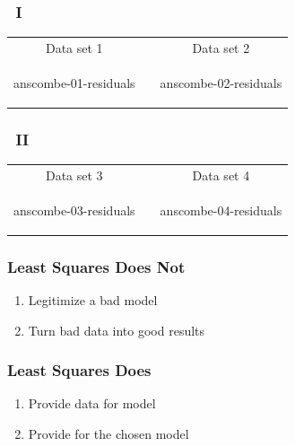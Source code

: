 \begin{frame}
\frametitle{\quartet \ I}
%
\begin{table}[htbp]
	\begin{center}
	\begin{tabular}{ccc}
	Data set 1 && Data set 2 \\
	\begin{overpic}[ scale = \myscale ]
		{\pLocalGraphics anscombe-01-residuals}
	\end{overpic}
	&&
	\begin{overpic}[ scale = \myscale ]
		{\pLocalGraphics anscombe-02-residuals}
	\end{overpic} \\
	\end{tabular}
	\end{center}
\label{tab:anscombe-data-set-error}
\end{table}%
\end{frame}
%
\begin{frame}
\frametitle{\quartet \ II}
%
\begin{table}[htbp]
	\begin{center}
	\begin{tabular}{ccc}
	Data set 3 && Data set 4 \\
	\begin{overpic}[ scale = \myscale ]
		{\pLocalGraphics anscombe-03-residuals}
	\end{overpic}
	&&
	\begin{overpic}[ scale = \myscale ]
		{\pLocalGraphics anscombe-04-residuals}
	\end{overpic} \\
	\end{tabular}
	\end{center}
\label{tab:anscombe-data-set-error}
\end{table}%
\end{frame}
%
\begin{frame}
\frametitle{Least Squares Does Not}
\begin{enumerate}
	\item Legitimize a bad model
	\item Turn bad data into good results
\end{enumerate}
\end{frame}
%
\begin{frame}
\frametitle{Least Squares Does}
\begin{enumerate}
	\item Provide  data for model 
	\item Provide  for the chosen model
\end{enumerate}
\end{frame}
%
%
